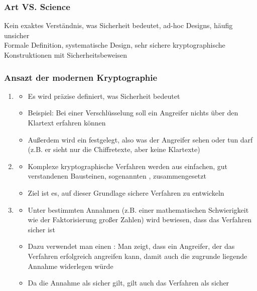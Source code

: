\subsubsection*{Art VS. Science}
 Kein exaktes Verständnis, was Sicherheit bedeutet, ad-hoc Designs, häufig unsicher\\
 Formale Definition, systematische Design, sehr sichere kryptographische Konstruktionen mit Sicherheitsbeweisen
\subsubsection*{Ansazt der modernen Kryptographie}
\begin{enumerate}
    \item {}
    \begin{itemize}
        \item Es wird präzise definiert, was Sicherheit bedeutet
        \item Beispiel: Bei einer Verschlüsselung soll ein Angreifer nichts über den Klartext erfahren können
        \item Außerdem wird ein  festgelegt, also was der Angreifer sehen oder tun darf (z.B. er sieht nur die Chiffretexte, aber keine Klartexte)
    \end{itemize}
    \item {}
    \begin{itemize}
        \item Komplexe kryptographische Verfahren werden aus einfachen, gut verstandenen Bausteinen, sogenannten , zusammengesetzt
        \item Ziel ist es, auf dieser Grundlage sichere Verfahren zu entwickeln
    \end{itemize}
    \item {}
    \begin{itemize}
        \item Unter bestimmten Annahmen (z.B. einer mathematischen Schwierigkeit wie der Faktorisierung großer Zahlen) wird bewiesen, dass das Verfahren sicher ist
        \item Dazu verwendet man einen : Man zeigt, dass ein Angreifer, der das Verfahren erfolgreich angreifen kann, damit auch die zugrunde liegende Annahme widerlegen würde
        \item Da die Annahme als sicher gilt, gilt auch das Verfahren als sicher
    \end{itemize}
\end{enumerate}
